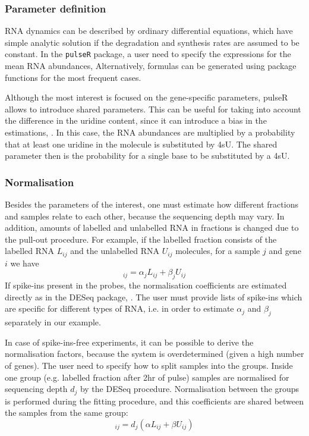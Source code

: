 \subsubsection*{Parameter definition}
RNA dynamics can be described by ordinary differential equations,
which have simple analytic solution 
if the degradation and synthesis rates are assumed to be constant.
In the \verb|pulseR| package,
a user need to specify the expressions for the mean RNA abundances,
Alternatively, formulas can be generated using package functions for the 
most frequent cases. 

Although the most interest is focused on the gene-specific parameters,
pulseR allows to introduce shared parameters.
 This can be useful for taking into account the difference in the uridine content, since
it can introduce a bias in the estimations, \citep{miller2011dynamic,
schwalb2012measurement}.
In this case, the RNA abundances are multiplied by 
a probability that at least one uridine in the molecule is substituted by 4sU.
The shared parameter then is the probability for a single base to be substituted
by a 4sU.
\subsubsection*{Normalisation}
Besides the parameters of the interest, one must estimate how different fractions
and samples relate to each other, because  the sequencing depth may vary.
In addition, amounts of labelled and unlabelled RNA in fractions is  changed due to 
the pull-out procedure. 
 For example, 
if the labelled fraction consists of the labelled RNA $L_{ij}$ and the unlabelled RNA
 $U_{ij}$ molecules, for a sample $j$ and gene $i$ we have 
\begin{equation}
 [\text{labelled fraction}]_{ij}  = \alpha_{j} L_{ij} + \beta_{j} U_{ij}
\end{equation}
If spike-ins present in the probes, the normalisation coefficients 
are estimated directly as in the DESeq package, \citet{anders2010differential}. 
The user must provide lists of spike-ins which are  specific for different types of RNA, 
i.e. in order to estimate $\alpha_j$ and $\beta_j$ separately in our example.
\par
In case of spike-ins-free experiments, 
it can be possible to derive the normalisation factors, 
because the system is overdetermined (given a high number of genes).
The user need to specify how to split samples into the groups.
Inside one group (e.g. labelled fraction after 2hr of pulse) samples are normalised for sequencing depth $d_j$ by
the DESeq procedure.
Normalisation between the groups is performed during the fitting procedure, 
and this coefficients are shared between the samples from the same group:
\begin{equation}
 [\text{labelled fraction}]_{ij}  = d_j(\alpha L_{ij} + \beta U_{ij})
\end{equation}

